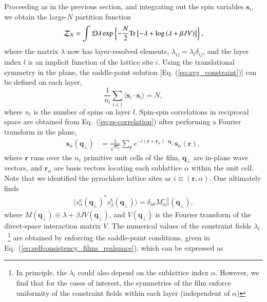 \documentclass[aps,prx,reprint,runinaddress,superscriptaddress,amsmath,amssymb,floatfix,longbibliography]{revtex4-1}
\def \la {\langle}
\def \ra {\rangle}
\renewcommand{\vec}[1]{\boldsymbol{#1}}
\newcommand{\mat}[1]{#1}
\newcommand{\cc}[1]{{#1}^*}
\begin{document}
Proceeding as in the previous section, and integrating out the spin variables $\vec{s}_i$, we obtain the large-$N$ partition function
%
\begin{equation}
\mathcal{Z}_N = \int \mathcal{D} \lambda
\exp\left\{
-\frac{N}{2} {\rm Tr}\left[- \lambda + \log\left(
\lambda + \beta J \mat{V}\right)
\right]
\right\},
\label{eq:H_films}
\end{equation}
%
where the matrix $\lambda$ now has layer-resolved elements, $\lambda_{ij} = \lambda_l \delta_{ij}$, and the layer index $l$ is an implicit function of the lattice site $i$. Using the translational symmetry in the plane, the saddle-point solution [Eq. (\ref{eq:avg_constraint})] can be defined on each layer,
%
\begin{equation}
\frac{1}{n_l}\sum_{i \in l} \la{\vec{s}_i \cdot \vec{s}_i}\ra = N, 
\label{eq:selfconsistency_films_realspace}
\end{equation} 
%
where $n_l$ is the number of spins on layer $l$. Spin-spin correlations in reciprocal space are obtained from Eq.~(\ref{eq:ss-correlation}) after performing a Fourier transform in the plane,
%
	\begin{align}	
		\vec{s}_\alpha(\vec{q}_{\perp}) &= \frac{1}{\sqrt{n_c}} \sum_{\vec{r}} e^{-i (\vec{r} + \vec{r}_\alpha) \cdot { \vec{q}_\perp }} \vec{s}_\alpha(\vec{r}),
	\end{align}
%
where $\vec{r}$ runs over the $n_c$ primitive unit cells of the film, $\vec{q}_\perp$ are in-plane wave vectors, and $\vec{r}_\alpha$ are basis vectors locating each sublattice $\alpha$ within the unit cell. Note that we identified the pyrochlore lattice sites as $i \equiv (\mathbf{r}, \alpha)$. One ultimately finds
%
\begin{align}
\la \cc{s^a_\alpha({\vec{q}_\perp})} s^b_\beta({\vec{q}_\perp})\ra = \delta_{ab}  M^{-1}_{\alpha\beta}(\vec{q}_\perp) ,
\label{eq:correlations_films_qspace}
\end{align}
%
where $ M(\vec{q}_\perp) \equiv \lambda + \beta J V(\vec{q}_\perp)$, and $\mat{V}(\vec{q}_\perp)$ is the Fourier transform of the direct-space interaction matrix $\mat{V}$.
The numerical values of the constraint fields $\lambda_l$
%
~\footnote{In principle, the $\lambda_{l}$ could also depend on the sublattice index $\alpha$. However, we find that for the cases of interest, the symmetries of the film enforce uniformity of the constraint fields within each layer (independent of $\alpha$)}  
%
are obtained by enforcing the saddle-point conditions, given in Eq.~(\ref{eq:selfconsistency_films_realspace}), which can be expressed as
\end{document}

